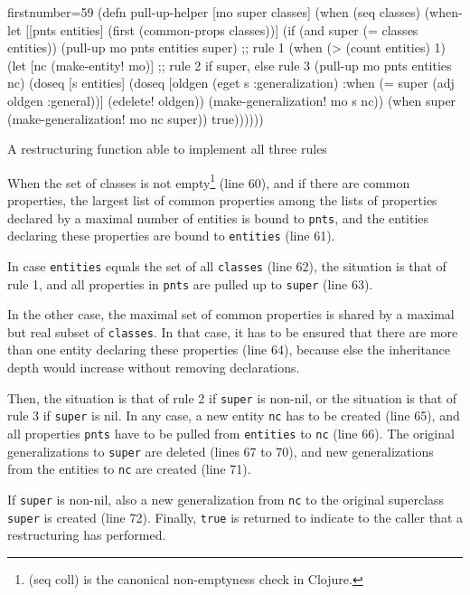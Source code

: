 \documentclass[submission]{eptcs}
\begin{document}
\begin{listing}[htbp]
  \begin{clojurecode*}{firstnumber=59}
(defn pull-up-helper [mo super classes]
  (when (seq classes)
    (when-let [[pnts entities] (first (common-props classes))]
      (if (and super (= classes entities))
        (pull-up mo pnts entities super)  ;; rule 1
        (when (> (count entities) 1)
          (let [nc (make-entity! mo)]     ;; rule 2 if super, else rule 3
            (pull-up mo pnts entities nc)
            (doseq [s entities]
              (doseq [oldgen (eget s :generalization)
                      :when (= super (adj oldgen :general))]
                (edelete! oldgen))
              (make-generalization! mo s nc))
            (when super (make-generalization! mo nc super))
            true))))))
  \end{clojurecode*}
  \caption{A restructuring function able to implement all three rules}
  \label{lst:pull-up-helper}
\end{listing}

When the set of classes is not empty\footnote{\textsf{(seq coll)} is the
  canonical non-emptyness check in Clojure.} (line 60), and if there are common
properties, the largest list of common properties among the lists of properties
declared by a maximal number of entities is bound to \verb|pnts|, and the
entities declaring these properties are bound to \verb|entities| (line 61).

In case \verb|entities| equals the set of all \verb|classes| (line 62), the
situation is that of rule 1, and all properties in \verb|pnts| are pulled up to
\verb|super| (line 63).

In the other case, the maximal set of common properties is shared by a maximal
but real subset of \verb|classes|.  In that case, it has to be ensured that
there are more than one entity declaring these properties (line 64), because
else the inheritance depth would increase without removing declarations.

Then, the situation is that of rule 2 if \verb|super| is non-nil, or the
situation is that of rule 3 if \verb|super| is nil.  In any case, a new entity
\verb|nc| has to be created (line 65), and all properties \verb|pnts| have to
be pulled from \verb|entities| to \verb|nc| (line 66).  The original
generalizations to \verb|super| are deleted (lines 67 to 70), and new
generalizations from the entities to \verb|nc| are created (line 71).

If \verb|super| is non-nil, also a new generalization from \verb|nc| to the
original superclass \verb|super| is created (line 72).  Finally, \verb|true| is
returned to indicate to the caller that a restructuring has performed.
\end{document}

